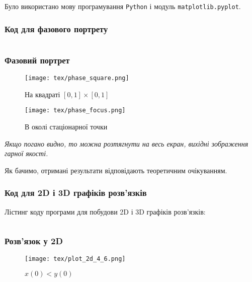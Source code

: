 Було використано мову програмування \texttt{Python} і модуль \texttt{matplotlib.pyplot}.

\subsubsection{Код для фазового портрету}

\inputminted{python}{py/phase.py}

\newpage

\subsubsection{Фазовий портрет}

\begin{minipage}[t]{.5\textwidth}
	\begin{figure}[H]
		\centering
		\caption{На квадраті $[0, 1] \times [0, 1]$}
		\texttt{[image: tex/phase\_square.png]}
	\end{figure}
\end{minipage}
\begin{minipage}[t]{.5\textwidth}
	\begin{figure}[H]
		\centering
		\caption{В околі стаціонарної точки}
		\texttt{[image: tex/phase\_focus.png]}
	\end{figure}
\end{minipage}

\textit{Якщо погано видно, то можна розтягнути на весь екран, вихідні зображення гарної якості.} \medskip

Як бачимо, отримані результати відповідають теоретичним очікуванням.

\subsubsection{Код для 2D і 3D графіків розв'язків}

Лістинг коду програми для побудови 2D і 3D графіків розв'язків:
\inputminted{python}{py/plots.py}

\newpage

\subsubsection{Розв'язок у 2D}

\begin{figure}[H]
	\centering
	\caption{$x(0) < y(0)$}
	\texttt{[image: tex/plot\_2d\_4\_6.png]}
\end{figure}

